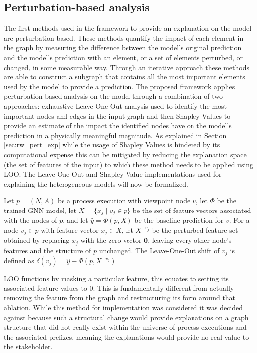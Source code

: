         \subsection{Perturbation-based analysis}
        \label{sec:dataset_perturb}
            The first methods used in the framework to provide an explanation on the model are perturbation-based. These methods quantify the impact of each element in the graph by measuring the difference between the model's original prediction and the model's prediction with an element, or a set of elements perturbed, or changed, in some measurable way. Through an iterative approach these methods are able to construct a subgraph that contains all the most important elements used by the model to provide a prediction. The proposed framework applies perturbation-based analysis on the model through a combination of two approaches: exhaustive Leave-One-Out analysis used to identify the most important nodes and edges in the input graph and then Shapley Values to provide an estimate of the impact the identified nodes have on the model's prediction in a physically meaningful magnitude. As explained in Section \ref{sec:rw_pert_exp} while the usage of Shapley Values is hindered by its computational expense this can be mitigated by reducing the explanation space (the set of features of the input) to which these method needs to be applied using LOO. The Leave-One-Out and Shapley Value implementations used for explaining the heterogeneous models will now be formalized.

            \begin{definition}
            \label{def:LOO}
                Let $p=(N,A)$ be a process execution with viewpoint node $v$, let $\Phi$ be the trained GNN model, let $X=\{x_j \mid v_j \in p\}$ be the set of feature vectors associated with the nodes of $p$, and let $\hat y = \Phi(p,X)$ be the baseline prediction for $v$. For a node $v_j \in p$ with feature vector $x_j \in X$, let $X^{-v_j}$ be the perturbed feature set obtained by replacing $x_j$ with the zero vector $\mathbf{0}$, leaving every other node's features and the structure of $p$ unchanged. The Leave-One-Out shift of $v_j$ is defined as
                $\delta(v_j) = \hat{y} - \Phi(p,X^{-v_j})$
            \end{definition}

            LOO functions by masking a particular feature, this equates to setting its associated feature values to 0. This is fundamentally different from actually removing the feature from the graph and restructuring its form around that ablation. While this method for implementation was considered it was decided against because such a structural change would provide explanations on a graph structure that did not really exist within the universe of process executions and the associated prefixes, meaning the explanations would provide no real value to the stakeholder.


